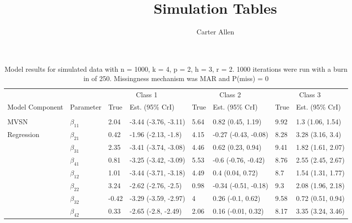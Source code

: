 \documentclass[]{article}
\title{Simulation Tables}
\author{Carter Allen}
\date{}
\begin{document}
\maketitle

\begin{table}[t]

\caption{\label{tab:unnamed-chunk-4}Model results for simulated data with n = 1000, k = 4, p = 2, h = 3, r = 2. 1000 iterations were run with a burn in of 250. Missingness mechanism was MAR and P(miss) = 0}
\centering
\fontsize{8}{10}\selectfont
\begin{tabular}{llllllll}
\toprule
\multicolumn{2}{c}{ } & \multicolumn{2}{c}{Class 1} & \multicolumn{2}{c}{Class 2} & \multicolumn{2}{c}{Class 3} \\
\cmidrule(l{3pt}r{3pt}){3-4} \cmidrule(l{3pt}r{3pt}){5-6} \cmidrule(l{3pt}r{3pt}){7-8}
Model Component & Parameter & True & Est. (95\% CrI) & True & Est. (95\% CrI) & True & Est. (95\% CrI)\\
\midrule
\addlinespace[0.3em]
\multicolumn{8}{l}{\textbf{ }}\\
\hspace{1em}MVSN & $\beta_{11}$ & 2.04 & -3.44 (-3.76, -3.11) & 5.64 & 0.82 (0.45, 1.19) & 9.92 & 1.3 (1.06, 1.54)\\
\hspace{1em}Regression & $\beta_{21}$ & 0.42 & -1.96 (-2.13, -1.8) & 4.15 & -0.27 (-0.43, -0.08) & 8.28 & 3.28 (3.16, 3.4)\\
\hspace{1em} & $\beta_{31}$ & 2.35 & -3.41 (-3.74, -3.08) & 4.46 & 0.62 (0.23, 0.94) & 9.41 & 1.82 (1.61, 2.07)\\
\hspace{1em} & $\beta_{41}$ & 0.81 & -3.25 (-3.42, -3.09) & 5.53 & -0.6 (-0.76, -0.42) & 8.76 & 2.55 (2.45, 2.67)\\
\hspace{1em} & $\beta_{12}$ & 1.01 & -3.44 (-3.71, -3.18) & 4.49 & 0.4 (0.04, 0.72) & 8.7 & 1.54 (1.31, 1.77)\\
\hspace{1em} & $\beta_{22}$ & 3.24 & -2.62 (-2.76, -2.5) & 0.98 & -0.34 (-0.51, -0.18) & 9.3 & 2.08 (1.96, 2.18)\\
\hspace{1em} & $\beta_{32}$ & -0.42 & -3.29 (-3.59, -2.97) & 4 & 0.26 (-0.1, 0.62) & 9.58 & 0.72 (0.51, 0.94)\\
\hspace{1em} & $\beta_{42}$ & 0.33 & -2.65 (-2.8, -2.49) & 2.06 & 0.16 (-0.01, 0.32) & 8.17 & 3.35 (3.24, 3.46)\\

\end{tabular}
\end{table}
\end{document}
